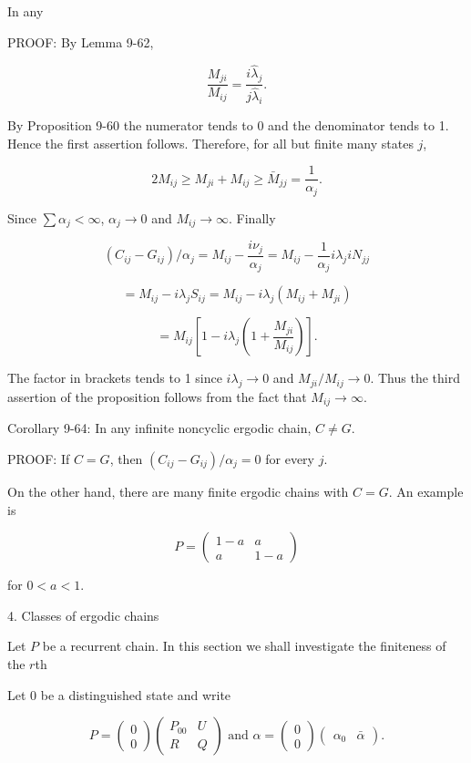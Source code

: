 In any

PROOF: By Lemma 9-62,

$$\frac{M_{ji}}{M_{ij}} = \frac{i \hat{\lambda}_j}{j \hat{\lambda}_i}.$$

By Proposition 9-60 the numerator tends to 0 and the denominator tends to 1. Hence the first assertion follows. Therefore, for all but finite many states $j$,

$$2M_{ij} \geq M_{ji} + M_{ij} \geq \bar{M}_{jj} = \frac{1}{\alpha_j}.$$

Since $\sum \alpha_j < \infty$, $\alpha_j \to 0$ and $M_{ij} \to \infty$. Finally

$$(C_{ij} - G_{ij})/\alpha_j = M_{ij} - \frac{i \nu_j}{\alpha_j} = M_{ij} - \frac{1}{\alpha_j} i \lambda_j i N_{jj}$$

$$= M_{ij} - i \lambda_j S_{ij} = M_{ij} - i \lambda_j (M_{ij} + M_{ji})$$

$$= M_{ij} \left[ 1 - i \lambda_j \left( 1 + \frac{M_{ji}}{M_{ij}} \right) \right].$$

The factor in brackets tends to 1 since $i \lambda_j \to 0$ and $M_{ji}/M_{ij} \to 0$. Thus the third assertion of the proposition follows from the fact that $M_{ij} \to \infty$.

Corollary 9-64: In any infinite noncyclic ergodic chain, $C \neq G$.

PROOF: If $C = G$, then $(C_{ij} - G_{ij})/\alpha_j = 0$ for every $j$.

On the other hand, there are many finite ergodic chains with $C = G$. An example is

$$P = \begin{pmatrix} 1 - a & a \\ a & 1 - a \end{pmatrix}$$

for $0 < a < 1$.

4. Classes of ergodic chains

Let $P$ be a recurrent chain. In this section we shall investigate the finiteness of the $r$th

Let 0 be a distinguished state and write

$$P = \begin{pmatrix} 0 \\ 0 \end{pmatrix} \begin{pmatrix} P_{00} & U \\ R & Q \end{pmatrix} \text{ and } \alpha = \begin{pmatrix} 0 \\ 0 \end{pmatrix} \begin{pmatrix} \alpha_0 & \bar{\alpha} \end{pmatrix}.$$

